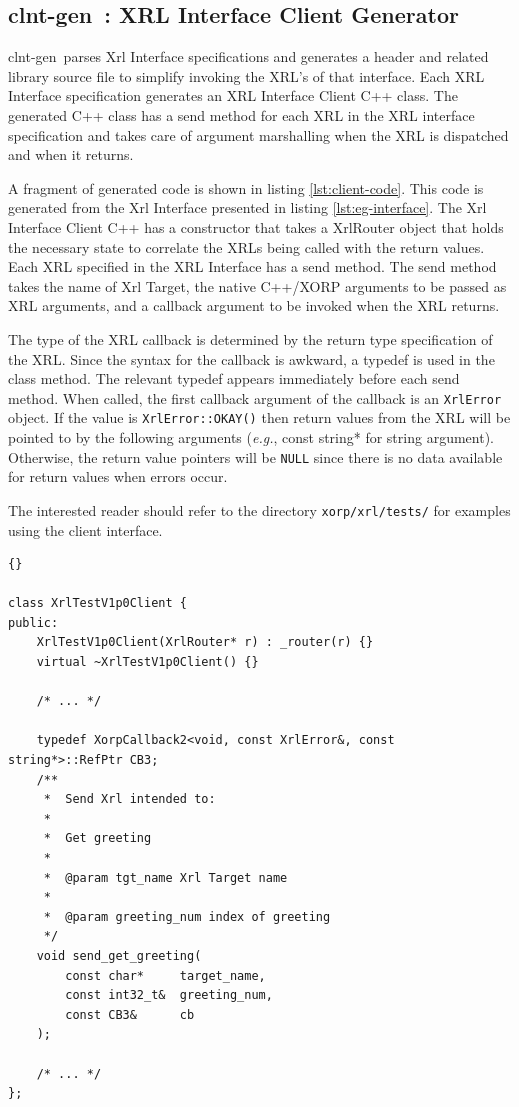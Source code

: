 \documentclass[11pt]{article}
\newcommand{\eg}{\emph{e.g.\/}} %
\newcommand{\clntgen}{{\sf clnt-gen}~}
\begin{document}
\subsection{\clntgen : XRL Interface Client Generator}

\clntgen parses Xrl Interface specifications and generates a header
and related library source file to simplify invoking the XRL's of that
interface.  Each XRL Interface specification generates an XRL
Interface Client C++ class.  The generated C++ class has a send method
for each XRL in the XRL interface specification and takes care of
argument marshalling when the XRL is dispatched and when it returns.

A fragment of generated code is shown in listing \ref{lst:client-code}.
This code is generated from the Xrl Interface presented in listing
\ref{lst:eg-interface}.  The Xrl Interface Client C++ has a constructor
that takes a XrlRouter object that holds the necessary state to
correlate the XRLs being called with the return values.  Each XRL
specified in the XRL Interface has a send method.  The send method
takes the name of Xrl Target, the native C++/XORP arguments to be
passed as XRL arguments, and a callback argument to be invoked when
the XRL returns.

The type of the XRL callback is determined by the return type
specification of the XRL.  Since the syntax for the callback is awkward,
a typedef is used in the class method.  The relevant typedef appears
immediately before each send method.  When called, the first callback
argument of the callback is an {\tt XrlError} object.  If the value is
{\tt XrlError::OKAY()} then return values from the XRL will be pointed
to by the following arguments (\eg, const string* for string argument).
Otherwise, the return value pointers will be {\tt NULL} since there is
no data available for return values when errors occur.

The interested reader should refer to the directory {\tt xorp/xrl/tests/}
for examples using the client interface.

\begin{lstlisting}[caption={ Fragment of a C++ XRL Client. %
                                     \label{lst:client-code} } ]{}

class XrlTestV1p0Client {
public:
    XrlTestV1p0Client(XrlRouter* r) : _router(r) {}
    virtual ~XrlTestV1p0Client() {}

    /* ... */

    typedef XorpCallback2<void, const XrlError&, const string*>::RefPtr CB3;
    /**
     *  Send Xrl intended to:
     *
     *  Get greeting
     *
     *  @param tgt_name Xrl Target name
     *
     *  @param greeting_num index of greeting
     */
    void send_get_greeting(
        const char*     target_name,
        const int32_t&  greeting_num,
        const CB3&      cb
    );

    /* ... */
};
\end{lstlisting}
\end{document}
